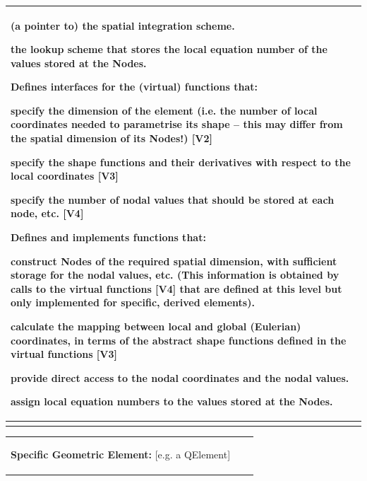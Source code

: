 \begin{center}
\begin{longtabu}
\begin{center}
\begin{tabularx}{\linewidth}{|*{1}{>{\raggedright\arraybackslash}X|}}
\begin{DoxyItemize}
\begin{DoxyItemize}
\item (a pointer to) the spatial integration scheme.
\item the lookup scheme that stores the local equation number of the values stored at the {\ttfamily Nodes}.
\end{DoxyItemize}
\item Defines interfaces for the (virtual) functions that\+:
\begin{DoxyItemize}
\item specify the dimension of the element (i.\+e. the number of local coordinates needed to parametrise its shape -- this may differ from the spatial dimension of its {\ttfamily Nodes!}) \mbox{[}{\bfseries V2}\mbox{]}
\item specify the shape functions and their derivatives with respect to the local coordinates \mbox{[}{\bfseries V3}\mbox{]}
\item specify the number of nodal values that should be stored at each node, etc. \mbox{[}{\bfseries V4}\mbox{]}
\end{DoxyItemize}
\item Defines and implements functions that\+:
\begin{DoxyItemize}
\item construct {\ttfamily Nodes} of the required spatial dimension, with sufficient storage for the nodal values, etc. (This information is obtained by calls to the virtual functions \mbox{[}V4\mbox{]} that are defined at this level but only implemented for specific, derived elements).
\item calculate the mapping between local and global (Eulerian) coordinates, in terms of the abstract shape functions defined in the virtual functions \mbox{[}V3\mbox{]}
\item provide direct access to the nodal coordinates and the nodal values.
\item assign local equation numbers to the values stored at the {\ttfamily Nodes}.   
\end{DoxyItemize}
\end{DoxyItemize}\\\cline{1-1}
\end{tabularx}
\end{center}  \begin{tabularx}{\linewidth}{|*{2}{>{\raggedright\arraybackslash}X|}}\hline
\begin{center} {\bfseries Specific Geometric Element\+:} \mbox{[}e.\+g. a {\ttfamily Q\+Element}\mbox{]} ~\newline

\end{center}
\end{tabularx}
\end{longtabu}
\end{center}
